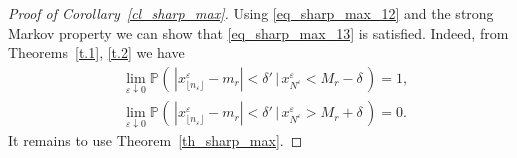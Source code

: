 \documentclass{article}
\theoremstyle{plain}
\theoremstyle{definition}
\theoremstyle{remark}
\newcommand{\p}[2][]{{\mathbb{P}}_{#1} \left( \, #2 \, \right) } %
\begin{document}
\begin{proof}[Proof of Corollary~\ref{cl_sharp_max}]
Using \eqref{eq_sharp_max_12} and the strong Markov property we can show that \eqref{eq_sharp_max_13} is satisfied. Indeed, from Theorems~\ref{t.1}, \ref{t.2} we have 
\begin{equation*}
\begin{split}
       & \lim_{\varepsilon \downarrow 0} \p{ |x_{\lfloor n_\varepsilon \rfloor 
       }^{\varepsilon} - m_r | < \delta'\, |\, x_{N^{\varepsilon}}^{\varepsilon} < M_r -\delta } =  1,  \\ & \lim_{\varepsilon \downarrow 0} \p{ |x_{\lfloor n_\varepsilon \rfloor 
       }^{\varepsilon} - m_r | < \delta'\, |\, x_{N^{\varepsilon}}^{\varepsilon} > M_r +\delta } =  0. 
\end{split}
\end{equation*}
It remains to use Theorem~\ref{th_sharp_max}.
 \end{proof}
\end{document}
